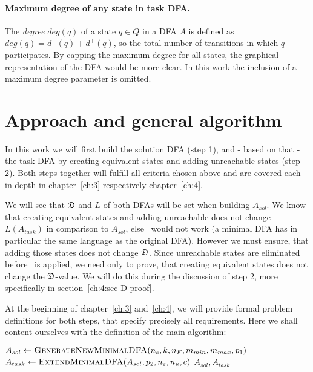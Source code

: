 \paragraph*{Maximum degree of any state in task DFA.}

The \emph{degree} $deg(q)$ of a state $q \in Q$ in a DFA $A$ is defined as $deg(q) = d^-(q) + d^+(q)$, so the total number of transitions in which $q$ participates. By capping the maximum degree for all states, the graphical representation of the DFA would be more clear. In this work the inclusion of a maximum degree parameter is omitted.


\section{Approach and general algorithm}

In this work we will first build the solution DFA (step 1), and - based on that - the task DFA by creating equivalent states and adding unreachable states (step 2). Both steps together will fulfill all criteria chosen above and are covered each in depth in chapter~\ref{ch:3} respectively chapter~\ref{ch:4}.

We will see that $\mathfrak{D}$ and $L$ of both DFAs will be set when building $A_{sol}$. We know that creating equivalent states and adding unreachable does not change $L(A_{task})$ in comparison to $A_{sol}$, else \MinAlg\ would not work (a minimal DFA has in particular the same language as the original DFA). However we must ensure, that adding those states does not change $\mathfrak{D}$. Since unreachable states are eliminated before \CompDist\ is applied, we need only to prove, that creating equivalent states does not change the $\mathfrak{D}$-value. We will do this during the discussion of step 2, more specifically in section~\ref{ch:4:sec-D-proof}.

At the beginning of chapter~\ref{ch:3} and~\ref{ch:4}, we will provide formal problem definitions for both steps, that specify precisely all requirements. Here we shall content ourselves with the definition of the main algorithm:
\vspace{0.2cm}
\begin{algorithmic}[1]
	\State $A_{sol} \gets \textsc{GenerateNewMinimalDFA}({n_s}, k, {n_F}, m_{min}, m_{max}, p_1)$
	\State $A_{task} \gets \textsc{ExtendMinimalDFA}(A_{sol}, p_2, {n_e},{n_u}, c)$
	\State \Return $A_{sol}, A_{task}$
	\EndFunction
\end{algorithmic}


